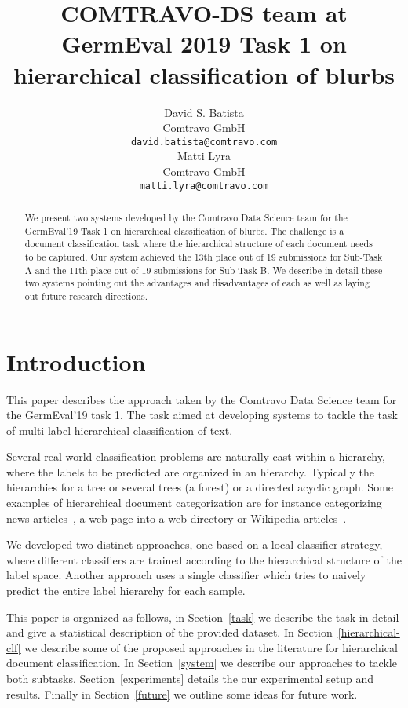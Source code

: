 \documentclass[11pt,a4paper]{article}
\title{COMTRAVO-DS team at GermEval 2019 Task 1 on hierarchical classification of blurbs}
\author{David S. Batista \\
  Comtravo GmbH \\
  {\tt david.batista@comtravo.com} \\\And
  Matti Lyra \\
  Comtravo GmbH \\
  {\tt matti.lyra@comtravo.com} \\}
\date{}
\begin{document}
\maketitle

\begin{abstract}
We present two systems developed by the Comtravo Data Science team for the GermEval'19 Task 1 on hierarchical classification of blurbs. The challenge is a document classification task where the hierarchical structure of each document needs to be captured. Our system achieved the 13th place out of 19 submissions for Sub-Task A and the 11th place out of 19 submissions for Sub-Task B. We describe in detail these two systems pointing out the advantages and disadvantages of each as well as laying out future research directions.
\end{abstract}




\section{Introduction}

This paper describes the approach taken by the Comtravo Data Science team
for the GermEval'19 task 1. The task aimed at developing systems to tackle the
task of multi-label hierarchical classification of text.

Several real-world classification problems are naturally cast within a hierarchy,
where the labels to be predicted are organized in an hierarchy. Typically the hierarchies
for a tree or several trees (a forest) or a directed acyclic graph. Some examples
of hierarchical document categorization are for instance categorizing news
articles~\cite{Lewis:2004:RNB:1005332.1005345}, a web page into a web directory
or Wikipedia articles~\cite{PartalasKBAPGAA15}.

We developed two distinct approaches, one based on a local classifier strategy, where different classifiers
are trained according to the hierarchical structure of the label space. Another
approach uses a single classifier which tries to naively predict the entire label
hierarchy for each sample.

This paper is organized as follows, in Section~\ref{task} we describe the task in
detail and give a statistical description of the provided dataset. In Section~\ref{hierarchical-clf}
we describe some of the proposed approaches in the literature for
hierarchical document classification. In Section~\ref{system} we describe
our approaches to tackle both subtasks. Section~\ref{experiments}
details the our experimental setup and results. Finally in Section~\ref{future} we
outline some ideas for future work.
\end{document}

